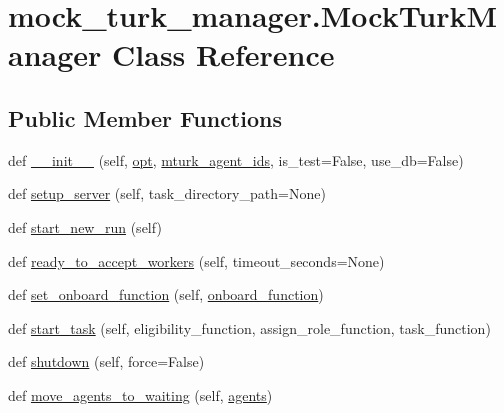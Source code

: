 \hypertarget{classmock__turk__manager_1_1MockTurkManager}{}\section{mock\+\_\+turk\+\_\+manager.\+Mock\+Turk\+Manager Class Reference}
\label{classmock__turk__manager_1_1MockTurkManager}
\subsection*{Public Member Functions}
\begin{DoxyCompactItemize}
\item 
def \hyperlink{classmock__turk__manager_1_1MockTurkManager_a8f6158c2e7ad659f0d4a1f54865dd766}{\+\_\+\+\_\+init\+\_\+\+\_\+} (self, \hyperlink{classmock__turk__manager_1_1MockTurkManager_a90215b4e820f59dd4772d5444a109b78}{opt}, \hyperlink{classmock__turk__manager_1_1MockTurkManager_a30a18776790f60114b54602b715ed77a}{mturk\+\_\+agent\+\_\+ids}, is\+\_\+test=False, use\+\_\+db=False)
\item 
def \hyperlink{classmock__turk__manager_1_1MockTurkManager_a7248f732e7b06f31b128c12829ae8081}{setup\+\_\+server} (self, task\+\_\+directory\+\_\+path=None)
\item 
def \hyperlink{classmock__turk__manager_1_1MockTurkManager_a7fb2641391d46226f50211cc2413b5b6}{start\+\_\+new\+\_\+run} (self)
\item 
def \hyperlink{classmock__turk__manager_1_1MockTurkManager_a24f972e7c54d6eb8a7c2dbe906018353}{ready\+\_\+to\+\_\+accept\+\_\+workers} (self, timeout\+\_\+seconds=None)
\item 
def \hyperlink{classmock__turk__manager_1_1MockTurkManager_a1becae520bdd1de25632adeadf0f67c5}{set\+\_\+onboard\+\_\+function} (self, \hyperlink{classmock__turk__manager_1_1MockTurkManager_a6e25bcd225d478f6dd719860f0b85499}{onboard\+\_\+function})
\item 
def \hyperlink{classmock__turk__manager_1_1MockTurkManager_aff5cae911d5177b4e8739ecac21ae3ac}{start\+\_\+task} (self, eligibility\+\_\+function, assign\+\_\+role\+\_\+function, task\+\_\+function)
\item 
def \hyperlink{classmock__turk__manager_1_1MockTurkManager_a033685772118f2d5b9cfde68f48d7bce}{shutdown} (self, force=False)
\item 
def \hyperlink{classmock__turk__manager_1_1MockTurkManager_a7e29a2707b002fbf2d18cc94e075f0a1}{move\+\_\+agents\+\_\+to\+\_\+waiting} (self, \hyperlink{classmock__turk__manager_1_1MockTurkManager_a7657aa553cb22b0eed025bd6ede834ed}{agents})

\end{DoxyCompactItemize}
